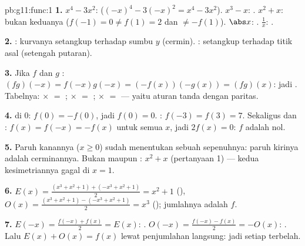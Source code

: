 \begin{solution}{pb:g11:func:1}
\textbf{1.} $x^4 - 3x^2$:  ($(-x)^4 - 3(-x)^2 = x^4 -
3x^2$). $x^3 - x$: . $x^2 + x$: bukan keduanya ($f(-1) = 0 \neq
f(1) = 2$ dan $\neq -f(1)$). $\abs x$: . $\frac1x$: .

\textbf{2.} : kurvanya setangkup terhadap sumbu $y$
(cermin). : setangkup terhadap titik asal (setengah putaran).

\textbf{3.} Jika $f$ dan $g$ :
$(fg)(-x) = f(-x)g(-x) = (-f(x))(-g(x)) = (fg)(x)$: jadi .
Tabelnya:  $\times$  $=$ ;  $\times$  $=$ ;
 $\times$  $=$  --- yaitu aturan tanda dengan paritas.

\textbf{4.}  di $0$: $f(0) = -f(0)$, jadi $f(0) = 0$. :
$f(-3) = f(3) = 7$. Sekaligus  dan :
$f(x) = f(-x) = -f(x)$ untuk semua $x$, jadi $2f(x) = 0$: $f$ adalah
 nol.

\textbf{5.} Paruh kanannya ($x \geq 0$) sudah menentukan sebuah  sepenuhnya: paruh kirinya adalah cerminannya. Bukan 
maupun : $x^2 + x$ (pertanyaan 1) --- kedua kesimetriannya gagal di
$x = 1$.

\textbf{6.} $E(x) = \frac{(x^3 + x^2 + 1) + (-x^3 + x^2 +
1)}{2} = x^2 + 1$ (), $O(x) = \frac{(x^3 + x^2 + 1) -
(-x^3 + x^2 + 1)}{2} = x^3$ (); jumlahnya adalah $f$.

\textbf{7.} $E(-x) = \frac{f(-x) + f(x)}{2} = E(x)$: .
$O(-x) = \frac{f(-x) - f(x)}{2} = -O(x)$: . Lalu
$E(x) + O(x) = f(x)$ lewat penjumlahan langsung: jadi setiap 
terbelah.


\end{solution}
